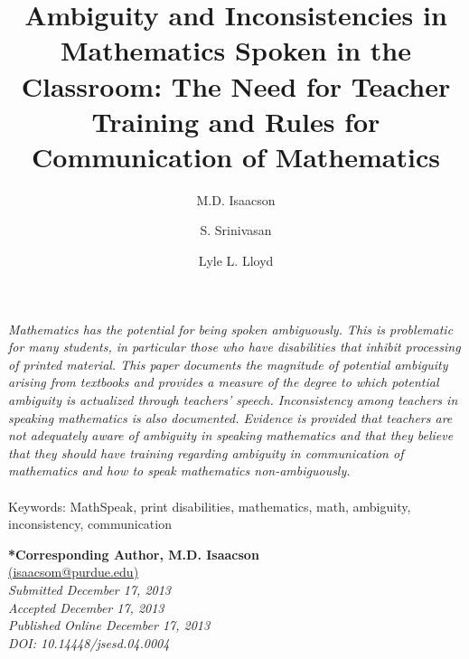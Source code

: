\documentclass[11.5pt]{sig-alternate} %
\makeatletter
\let\oldabstract\abstract
\let\oldendabstract\endabstract
\renewenvironment{abstract} %
{\renewenvironment{quotation}%
               {\list{}{\addtolength{\leftmargin}{1em} %
                        \listparindent 1.5em%
                        \itemindent    \listparindent%
                        \rightmargin   \leftmargin%
                        \parsep        \z@ \@plus\p@}%
                \item\relax}%
               {\endlist}%
\oldabstract}
{\oldendabstract}
\makeatother
\begin{document}
\title{Ambiguity and Inconsistencies in Mathematics Spoken in the Classroom: The Need for Teacher Training and Rules for Communication of Mathematics}

\author[1]{\large \color{blue} M.D. Isaacson}
\author[1]{\large \color{blue} S. Srinivasan}
\author[1]{\large \color{blue} Lyle L. Lloyd}


\toappear{}

\maketitle
\begin{@twocolumnfalse} 
\begin{abstract}
\item 
\begin{large}
\textit{Mathematics has the potential for being spoken ambiguously. This is problematic for many students, in particular those who have disabilities that inhibit processing of printed material. This paper documents the magnitude of potential ambiguity arising from textbooks and provides a measure of the degree to which potential ambiguity is actualized through teachers’ speech. Inconsistency among teachers in speaking mathematics is also documented. Evidence is provided that teachers are not adequately aware of ambiguity in speaking mathematics and that they believe that they should have training regarding ambiguity in communication of mathematics and how to speak mathematics non-ambiguously.} \\ \\
 
Keywords: MathSpeak, print disabilities, mathematics, math, ambiguity, inconsistency, communication

\end{large}     
\end{abstract}
\end{@twocolumnfalse}



\textbf{*Corresponding Author, M.D. Isaacson}\\
\href{mailto:isaacsom@purdue.edu}{(isaacsom@purdue.edu)}\\
\textit{Submitted December 17, 2013}\\
\textit{Accepted December 17, 2013}\\
\textit{Published Online December 17, 2013}\\
\textit{DOI: 10.14448/jsesd.04.0004}\\
\end{document}
